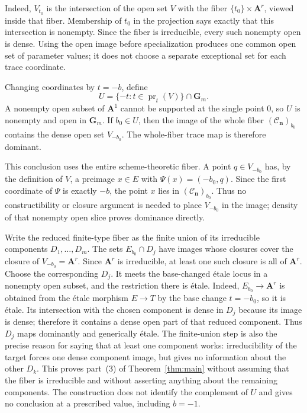 \documentclass[11pt]{article}
\theoremstyle{definition}
\theoremstyle{remark}
\newcommand{\A}{\mathbf A}
\newcommand{\Gm}{\mathbf G_m}
\newcommand{\cC}{\mathcal C}
\newcommand{\bn}{\mathbf n}
\begin{document}
Indeed, $V_{t_0}$ is the intersection of the open set $V$ with the fiber
$\{t_0\}\times\A^r$, viewed inside that fiber.  Membership of $t_0$ in the
projection says exactly that this intersection is nonempty.  Since the
fiber is irreducible, every such nonempty open is dense.  Using the open
image before specialization produces one common open set of parameter
values; it does not choose a separate exceptional set for each trace
coordinate.

Changing coordinates by $t=-b$, define
\[
  U=
  \{-t:t\in\operatorname{pr}_t(V)\}\cap\Gm.
\]
A nonempty open subset of $\A^1$ cannot be supported at the single point
$0$, so $U$ is nonempty and open in $\Gm$.  If $b_0\in U$, then the image of
the whole fiber $(\cC_{\bn})_{b_0}$ contains the dense open set
$V_{-b_0}$.  The whole-fiber trace map is therefore dominant.

This conclusion uses the entire scheme-theoretic fiber.  A point
$q\in V_{-b_0}$ has, by the definition of $V$, a preimage $x\in E$ with
$\Psi(x)=(-b_0,q)$.  Since the first coordinate of $\Psi$ is exactly $-b$,
the point $x$ lies in $(\cC_{\bn})_{b_0}$.  Thus no constructibility or
closure argument is needed to place $V_{-b_0}$ in the image; density of
that nonempty open slice proves dominance directly.

Write the reduced finite-type fiber as the finite union of its irreducible
components $D_1,\ldots,D_m$.  The sets
$E_{b_0}\cap D_j$ have images whose closures cover the closure of
$V_{-b_0}=\A^r$.  Since $\A^r$ is irreducible, at least one such closure is
all of $\A^r$.  Choose the corresponding $D_j$.  It meets the base-changed
étale locus in a nonempty open subset, and the restriction there is étale.
Indeed, $E_{b_0}\to\A^r$ is obtained from the étale morphism
$E\to T$ by the base change $t=-b_0$, so it is étale.  Its intersection
with the chosen component is dense in $D_j$ because its image is dense;
therefore it contains a dense open part of that reduced component.  Thus
$D_j$ maps dominantly and generically étale.  The finite-union step is also
the precise reason for saying that at least one component works:
irreducibility of the target forces one dense component image, but gives no
information about the other $D_k$.  This proves part~(3) of
Theorem~\ref{thm:main} without assuming that the fiber is irreducible and
without asserting anything about the remaining components.  The construction
does not identify the complement of $U$ and gives no conclusion at a
prescribed value, including $b=-1$.
\end{document}
